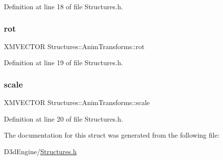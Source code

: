 Definition at line 18 of file Structures.\+h.

\mbox{\label{struct_structures_1_1_anim_transforms_a997e756b9008a2ea9bc5a6dc32ee2722}} 
\subsubsection{\texorpdfstring{rot}{rot}}
{\footnotesize\ttfamily X\+M\+V\+E\+C\+T\+OR Structures\+::\+Anim\+Transforms\+::rot}



Definition at line 19 of file Structures.\+h.

\mbox{\label{struct_structures_1_1_anim_transforms_a09e4355cddfc9e2dfd7c0450fd83d138}} 
\subsubsection{\texorpdfstring{scale}{scale}}
{\footnotesize\ttfamily X\+M\+V\+E\+C\+T\+OR Structures\+::\+Anim\+Transforms\+::scale}



Definition at line 20 of file Structures.\+h.



The documentation for this struct was generated from the following file\+:\begin{DoxyCompactItemize}
\item 
D3d\+Engine/\mbox{\hyperlink{_structures_8h}{Structures.\+h}}\end{DoxyCompactItemize}
